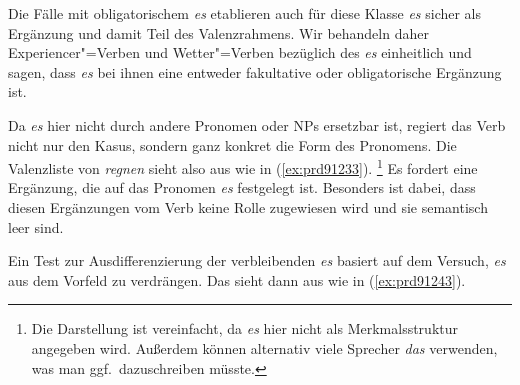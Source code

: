\begin{exe}
  \ex\label{ex:prde0001} 
  \begin{xlist}
  \end{xlist}
\end{exe}

Die Fälle mit obligatorischem \textit{es} etablieren auch für diese Klasse \textit{es} sicher als Ergänzung und damit Teil des Valenzrahmens.
Wir behandeln daher Experiencer"=Verben und Wetter"=Verben bezüglich des \textit{es} einheitlich und sagen, dass \textit{es} bei ihnen eine entweder fakultative oder obligatorische Ergänzung ist.

Da \textit{es} hier nicht durch andere Pronomen oder NPs ersetzbar ist, regiert das Verb nicht nur den Kasus, sondern ganz konkret die Form des Pronomens.
Die Valenzliste von \textit{regnen} sieht also aus wie in (\ref{ex:prd91233}).%
\footnote{Die Darstellung ist vereinfacht, da \textit{es} hier nicht als Merkmalsstruktur angegeben wird.
Außerdem können alternativ viele Sprecher \textit{das} verwenden, was man ggf.\ dazuschreiben müsste.}
Es fordert eine Ergänzung, die auf das Pronomen \textit{es} festgelegt ist.
Besonders ist dabei, dass diesen Ergänzungen vom Verb keine Rolle zugewiesen wird und sie semantisch leer sind.

\begin{exe}
\end{exe}

Ein Test zur Ausdifferenzierung der verbleibenden \textit{es} basiert auf dem Versuch, \textit{es} aus dem Vorfeld zu verdrängen.
Das sieht dann aus wie in (\ref{ex:prd91243}).

\begin{exe}
  \ex\label{ex:prd91243}
  \begin{xlist}
  \end{xlist}
\end{exe}

